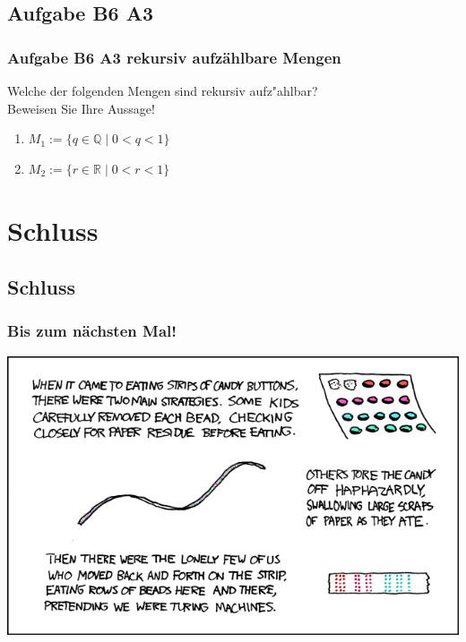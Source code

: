 \subsection{Aufgabe B6 A3}
\begin{frame}
	\frametitle{Aufgabe B6 A3 rekursiv aufzählbare Mengen}
	Welche der folgenden Mengen sind rekursiv aufz"ahlbar? \\
	Beweisen Sie Ihre Aussage!
	\begin{enumerate}
		\item $M_1 := \{q \in \mathbb{Q} \; | \; 0<q<1\}$
		\item $M_2 := \{r \in \mathbb{R} \; | \; 0<r<1\}$
	\end{enumerate}
\end{frame}

\section{Schluss}
\subsection{Schluss}
\begin{frame}
\frametitle{Bis zum nächsten Mal!}
\begin{center}
  \includegraphics[width=1 \textheight]{images/xkcd_205.png}
\end{center}
\end{frame}

